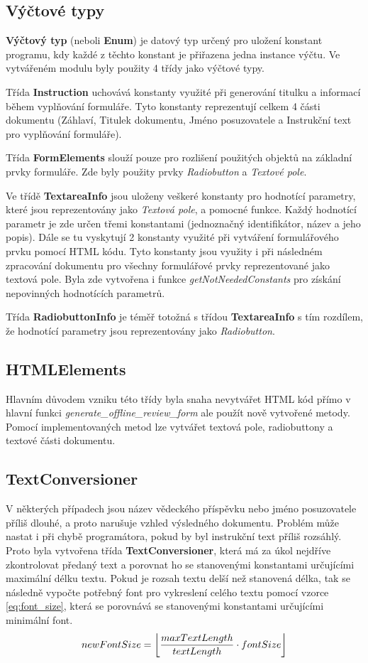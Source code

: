 \subsection{Výčtové typy}
\textbf{Výčtový typ} (neboli \textbf{Enum}) je datový typ určený pro uložení konstant programu, kdy každé z těchto konstant je přiřazena jedna instance výčtu. Ve vytvářeném modulu byly použity 4 třídy jako výčtové typy. 
\par
Třída \textbf{Instruction} uchovává konstanty využité při generování titulku a informací během vyplňování formuláře. Tyto konstanty reprezentují celkem 4 části dokumentu (Záhlaví, Titulek dokumentu, Jméno posuzovatele a Instrukční text pro vyplňování formuláře).
\par
Třída \textbf{FormElements} slouží pouze pro rozlišení použitých objektů na základní prvky formuláře. Zde byly použity prvky \textit{Radiobutton} a \textit{Textové pole}.
\par
Ve třídě \textbf{TextareaInfo} jsou uloženy veškeré konstanty pro hodnotící parametry, které jsou reprezentovány jako \textit{Textová pole}, a pomocné funkce. Každý hodnotící parametr je zde určen třemi konstantami (jednoznačný identifikátor, název a jeho popis). Dále se tu vyskytují 2 konstanty využité při vytváření formulářového prvku pomocí HTML kódu. Tyto konstanty jsou využity i při následném zpracování dokumentu pro všechny formulářové prvky reprezentované jako textová pole. Byla zde vytvořena i funkce \textit{getNotNeededConstants} pro získání nepovinných hodnotících parametrů.
\par
Třída \textbf{RadiobuttonInfo} je téměř totožná s třídou \textbf{TextareaInfo} s tím rozdílem, že hodnotící parametry jsou reprezentovány jako \textit{Radiobutton}.
\subsection{HTMLElements}
Hlavním důvodem vzniku této třídy byla snaha nevytvářet HTML kód přímo v hlavní funkci \textit{generate\_offline\_review\_form} ale použít nově vytvořené metody. Pomocí implementovaných metod lze vytvářet textová pole, radiobuttony a textové části dokumentu.
\subsection{TextConversioner}
V některých případech jsou název vědeckého příspěvku nebo jméno posuzovatele příliš dlouhé, a proto narušuje vzhled výsledného dokumentu. Problém může nastat i při chybě programátora, pokud by byl instrukční text příliš rozsáhlý. Proto byla vytvořena třída \textbf{TextConversioner}, která má za úkol nejdříve zkontrolovat předaný text a porovnat ho se stanovenými konstantami určujícími maximální délku textu. Pokud je rozsah textu delší než stanovená délka, tak se následně vypočte potřebný font pro vykreslení celého textu pomocí vzorce \eqref{eq:font_size}, která se porovnává se stanovenými konstantami určujícími minimální font. 
\begin{equation}
newFontSize = \floor*{\frac{maxTextLength}{textLength} \cdot fontSize} \label{eq:font_size}
\end{equation}

